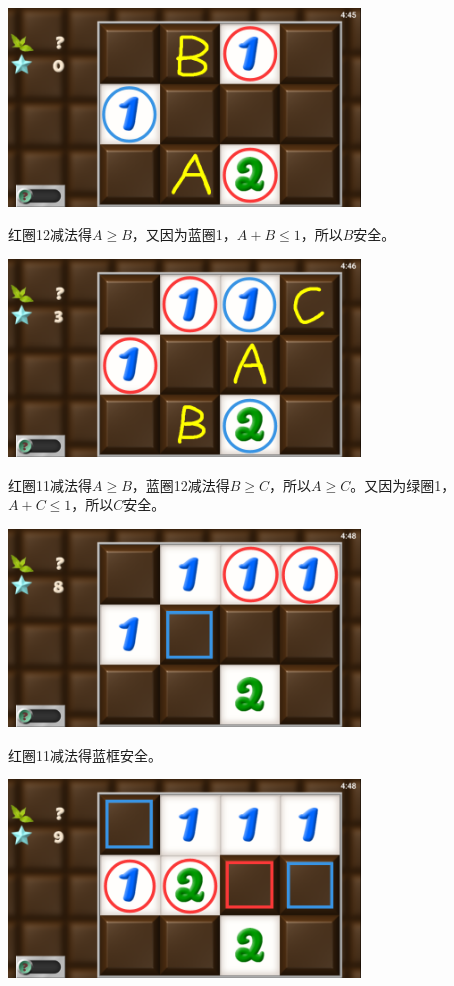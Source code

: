 \subsection{} %
\begin{center}
    \includegraphics[width=0.7\textwidth]{puzzle/72-1.png}
\end{center}
红圈12减法得$A\ge B$，又因为蓝圈1，$A+B\le 1$，所以$B$安全。
\begin{center}
    \includegraphics[width=0.7\textwidth]{puzzle/72-2.png}
\end{center}
红圈11减法得$A\ge B$，蓝圈12减法得$B\ge C$，所以$A\ge C$。又因为绿圈1，$A+C\le 1$，所以$C$安全。
\begin{center}
    \includegraphics[width=0.7\textwidth]{puzzle/72-3.png}
\end{center}
红圈11减法得蓝框安全。
\begin{center}
    \includegraphics[width=0.7\textwidth]{puzzle/72-4.png}
\end{center}
